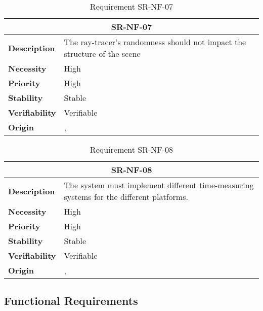 \begin{table}[H]
    \centering
    \begin{tabular}{l p{10cm}}
        \toprule
        \multicolumn{2}{c}{SR-NF-07} \\
        \toprule
        \textbf{Description}        & The ray-tracer's randomness should not impact the structure of the scene \\
        \textbf{Necessity}          &  High \\
        \textbf{Priority}           &  High \\
        \textbf{Stability}          &  Stable \\
        \textbf{Verifiability}      & Verifiable \\
        \textbf{Origin}             & \textit{\nameref{tab:ur-ca-10}}, \textit{\nameref{tab:ur-ca-14}} \\
    \end{tabular}
    \caption{Requirement SR-NF-07}
    \label{tab:sr-nf-07}
\end{table}

\begin{table}[H]
    \centering
    \begin{tabular}{l p{10cm}}
        \toprule
        \multicolumn{2}{c}{SR-NF-08} \\
        \toprule
        \textbf{Description}        &  The system must implement different time-measuring systems for the different platforms. \\
        \textbf{Necessity}          &  High \\
        \textbf{Priority}           &  High \\
        \textbf{Stability}          &  Stable \\
        \textbf{Verifiability}      & Verifiable \\
        \textbf{Origin}             & \textit{\nameref{tab:ur-ca-09}}, \textit{\nameref{tab:ur-ca-14}} \\
    \end{tabular}
    \caption{Requirement SR-NF-08}
    \label{tab:sr-nf-08}
\end{table}

\subsection{Functional Requirements}

